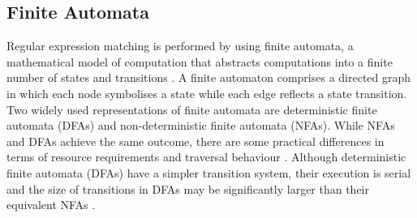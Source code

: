 \documentclass[10pt,onecolumn,twoside,english,a4paper]{article}
\begin{document}
\subsection{Finite Automata} \label{Finite Automata}
Regular expression matching is performed by using finite automata, a mathematical model of computation that abstracts computations into a finite number of states and transitions \cite{Becchi:regex_large_dataset}. A finite automaton comprises a directed graph in which each node symbolises a state while each edge reflects a state transition.
Two widely used representations of finite automata are deterministic finite automata (DFAs) and non-deterministic finite automata (NFAs). While NFAs and DFAs achieve the same outcome, there are some practical differences in terms of resource requirements and traversal behaviour \cite{Nourian:DemystifyingFSA}.
Although deterministic finite automata (DFAs) have a simpler transition system, their execution is serial and the size of transitions in DFAs may be significantly larger than their equivalent NFAs \cite{Liu:Asynchronous,Liu:WhyGPUSlowNFA}.
\end{document}
